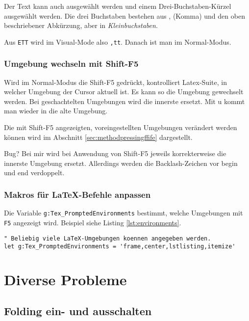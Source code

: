 \documentclass[a4paper,parskip=half,draft=true,DIV=15]{scrartcl}
\newcommand{\LS}{Latex-Suite}
\begin{document}
Der Text kann auch ausgewählt werden und einem Drei-Buchstaben-Kürzel ausgewählt werden.
Die drei Buchstaben bestehen aus , (Komma) und den oben beschriebener Abkürzung, aber in \emph{Kleinbuchstaben}.

Aus \texttt{ETT} wird im Visual-Mode also \texttt{,tt}.
Danach ist man im Normal-Modus.

\subsubsection{Umgebung wechseln mit Shift-F5}

Wird im Normal-Modus die Shift-F5 gedrückt, kontrolliert \LS, in welcher Umgebung der Cursor aktuell ist.
Es kann so die Umgebung gewechselt werden.
Bei geschachtelten Umgebungen wird die innerste ersetzt.
Mit u kommt man wieder in die alte Umgebung.

Die mit Shift-F5 angezeigten, voreingestellten Umgebungen verändert werden
können wird im Abschnitt \ref{sec:methodpressingffife} dargestellt.

Bug? Bei mir wird bei Anwendung von Shift-F5 jeweils korrekterweise die innerste Umgebung ersetzt.
Allerdings werden die Backlash-Zeichen vor begin und end verdoppelt.

\subsubsection{Makros für LaTeX-Befehle anpassen}
\label{sec:commandmappings}

Die Variable \texttt{g:Tex\_PromptedEnvironments} bestimmt, welche Umgebungen mit \texttt{F5}
angezeigt wird.
Beispiel siehe Listing \ref{lst:environments}.

\begin{lstlisting}[float,caption={Beispiel für Variable \texttt{g:Tex\_PromptedEnvironments} in der Datei \texttt{tex.vim} },label=lst:environments]
" Beliebig viele LaTeX-Umgebungen koennen angegeben werden.
let g:Tex_PromptedEnvironments = 'frame,center,lstlisting,itemize'
\end{lstlisting}

\section{Diverse Probleme}

\subsection{Folding ein- und ausschalten}
\end{document}
